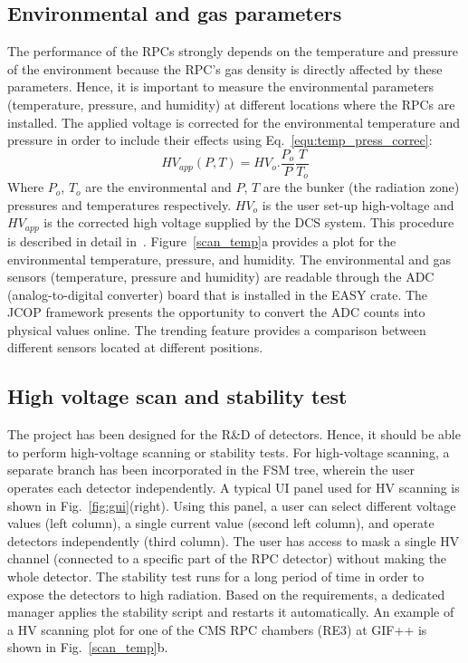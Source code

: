 \subsection{Environmental and gas parameters}
The performance of the RPCs strongly depends on the temperature and pressure of the environment because the RPC's gas density is directly affected by these parameters. Hence, it is important to measure the environmental parameters (temperature, pressure, and humidity) at different locations where the RPCs are installed. The applied voltage is corrected for the environmental temperature and pressure in order to include their effects using Eq.~\ref{equ:temp_press_correc}:  
\begin{equation}\label{equ:temp_press_correc}
HV_{app}(P, T) = HV_o . \frac{P_o}{P}\frac{T}{T_o}
\end{equation} 
Where $P_o$, $T_o$ are the environmental and $P$, $T$ are the bunker (the radiation zone) pressures and temperatures respectively. $HV_o$ is the user set-up high-voltage and $HV_{app}$ is the corrected high voltage supplied by the DCS system.
This procedure is described in detail in~\cite{env-rpc}. 
Figure~\ref{scan_temp}a provides a plot for the environmental temperature, pressure, and humidity. The environmental and gas sensors (temperature, pressure and humidity) are readable through the ADC (analog-to-digital converter) board that is installed in the EASY crate. The JCOP framework presents the opportunity to convert the ADC counts into physical values online. The trending feature provides a comparison between different sensors located at different positions.
\subsection{High voltage scan and stability test}
The project has been designed for the R\&D of detectors. Hence, it should be able to perform high-voltage scanning or stability tests. For high-voltage scanning, a separate branch has been incorporated in the FSM tree, wherein the user operates each detector independently. 
A typical UI panel used for HV scanning is shown in Fig.~\ref{fig:gui}(right). Using this panel, a user can select different voltage values (left column), a single current value (second left column), and operate detectors independently (third column). The user has access to mask a single HV channel (connected to a specific part of the RPC detector) without making the whole detector. 
The stability test runs for a long period of time in order to expose the detectors to high radiation. Based on the requirements, a dedicated manager applies the stability script and restarts it automatically. An example of a HV scanning plot for one of the CMS RPC chambers (RE3) at GIF++ is shown in Fig.~\ref{scan_temp}b. 

